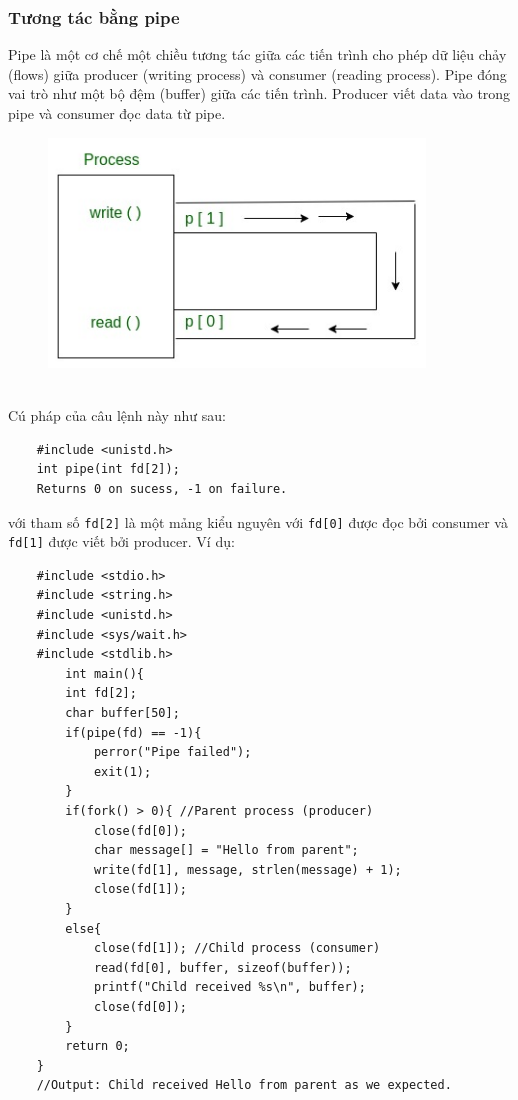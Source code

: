 \documentclass{article}
\begin{document}
\subsubsection{Tương tác bằng pipe}
Pipe là một cơ chế một chiều tương tác giữa các tiến trình cho phép dữ liệu chảy (flows) giữa producer (writing process) và
consumer (reading process). Pipe đóng vai trò như một bộ đệm (buffer) giữa các tiến trình. Producer viết data vào trong pipe và consumer đọc data từ pipe.
\begin{figure}[h]
    \begin{center}
    \includegraphics[width=10cm]{pipe.jpg}
    \end{center}
    \end{figure}
\\Cú pháp của câu lệnh này như sau:
\begin{verbatim}
    #include <unistd.h>
    int pipe(int fd[2]);
    Returns 0 on sucess, -1 on failure.
\end{verbatim}
với tham số \verb|fd[2]| là một mảng kiểu nguyên với \verb|fd[0]| được đọc bởi consumer và \verb|fd[1]| được viết bởi
producer. Ví dụ:
\begin{verbatim}
    #include <stdio.h>
    #include <string.h>
    #include <unistd.h>
    #include <sys/wait.h>
    #include <stdlib.h>
        int main(){
        int fd[2];
        char buffer[50];
        if(pipe(fd) == -1){
            perror("Pipe failed");
            exit(1);
        }
        if(fork() > 0){ //Parent process (producer)
            close(fd[0]);
            char message[] = "Hello from parent";
            write(fd[1], message, strlen(message) + 1);
            close(fd[1]);
        }
        else{
            close(fd[1]); //Child process (consumer)
            read(fd[0], buffer, sizeof(buffer));
            printf("Child received %s\n", buffer);
            close(fd[0]);
        }
        return 0;
    }
    //Output: Child received Hello from parent as we expected.
\end{verbatim}
\end{document}
